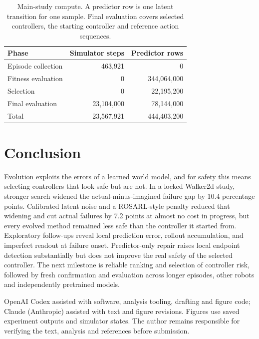 \documentclass[sigconf,dvipsnames]{acmart}
\newcommand{\rosarl}{ROSARL}
\begin{document}
\begin{table}[t]
\caption{Main-study compute. A predictor row is one latent transition for one
sample. Final evaluation covers selected controllers, the starting controller
and reference action sequences.}
\label{tab:costs}
\centering
\small
\begin{tabular}{lrr}
\toprule
Phase & Simulator steps & Predictor rows \\
\midrule
Episode collection & 463,921 & 0 \\
Fitness evaluation & 0 & 344,064,000 \\
Selection & 0 & 22,195,200 \\
Final evaluation & 23,104,000 & 78,144,000 \\
\midrule
Total & 23,567,921 & 444,403,200 \\
\bottomrule
\end{tabular}
\end{table}

\section{Conclusion}
\label{sec:conclusion}

Evolution exploits the errors of a learned world model, and for safety this
means selecting controllers that look safe but are not. In a locked Walker2d
study, stronger search widened the actual-minus-imagined failure gap by 10.4
percentage points. Calibrated latent noise and a \rosarl{}-style penalty
reduced that widening and cut actual failures by 7.2 points at almost no cost in
progress, but every evolved method remained less safe than the controller it
started from. Exploratory follow-ups reveal local prediction error, rollout
accumulation, and imperfect readout at failure onset. Predictor-only repair
raises local endpoint detection substantially but does not improve the real
safety of the selected controller. The next milestone is reliable ranking and
selection of controller risk, followed by fresh confirmation and evaluation
across longer episodes, other robots and independently pretrained models.

\begin{acks}
OpenAI Codex assisted with software, analysis tooling, drafting and figure code;
Claude (Anthropic) assisted with text and figure revisions. Figures use saved
experiment outputs and simulator states. The author remains responsible for
verifying the text, analysis and references before submission.
\end{acks}



\end{document}
